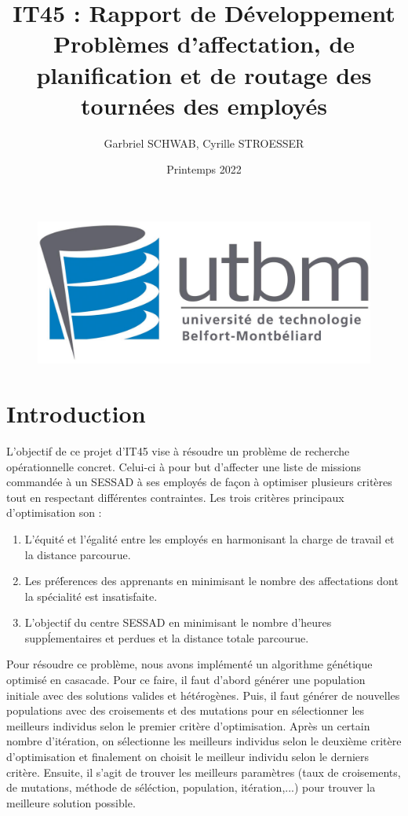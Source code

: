 \documentclass{article}
\title{IT45 : Rapport de Développement\\
[0.3em] 
\Large
Problèmes d’affectation, de planification et de routage des
tournées des employés }
\author{Garbriel SCHWAB, Cyrille STROESSER}
\date{Printemps 2022}
\begin{document}
\maketitle

\vspace*{4cm}

\begin{figure}[h] 
    \center 
    \includegraphics[scale=0.5]{utbm_forword-2.jpg} 
\end{figure}
\newpage
\tableofcontents

\newpage
\section{Introduction}

L'objectif de ce projet d'IT45 vise à résoudre un problème de recherche opérationnelle concret. Celui-ci à pour but d'affecter une liste de missions commandée à un SESSAD à ses employés de façon à optimiser plusieurs critères tout en respectant différentes contraintes. Les trois critères principaux d'optimisation son : 
\begin{enumerate}
  \item L’équité et l’égalité entre les employés en harmonisant la charge de travail et la distance parcourue.
  \item Les préf́erences des apprenants en minimisant le nombre des affectations dont la spécialité est insatisfaite.
  \item L’objectif du centre SESSAD en minimisant le nombre d’heures suppĺementaires et perdues et la distance totale parcourue.
\end{enumerate}
Pour résoudre ce problème, nous avons implémenté un algorithme génétique optimisé en casacade. Pour ce faire, il faut d'abord générer une population initiale avec des solutions valides et hétérogènes. Puis, il faut générer de nouvelles populations avec des croisements et des mutations pour en sélectionner les meilleurs individus selon le premier critère d'optimisation. Après un certain nombre d'itération, on sélectionne les meilleurs individus selon le deuxième critère d'optimisation et finalement on choisit le meilleur individu selon le derniers critère. Ensuite, il s'agit de trouver les meilleurs paramètres (taux de croisements, de mutations, méthode de séléction, population, itération,...) pour trouver la meilleure solution possible.
\newline
\end{document}
